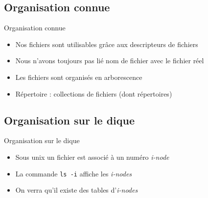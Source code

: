 \subsection{\sectitle}
\begin{frame}[containsverbatim]{\sectitle}
\def\subsectitle{Organisation connue}
\subsection{\subsectitle}
\begin{block}{\subsectitle}
\begin{itemize}
    \item Nos fichiers sont utilisables grâce aux descripteurs de fichiers
    \item Nous n'avons toujours pas lié nom de fichier avec le fichier réel
    \item Les fichiers sont organisés en arborescence
    \item Répertoire : collections de fichiers (dont répertoires)
\end{itemize}
\end{block}

\def\subsectitle{Organisation sur le dique}
\subsection{\subsectitle}
\begin{block}{\subsectitle}
    \begin{itemize}
        \item Sous unix un fichier est associé à un numéro \textit{i-node}
        \item La commande \verb+ls -i+ affiche les \textit{i-nodes}
        \item On verra qu'il existe des tables d'\textit{i-nodes}
    \end{itemize}
\end{block}

\end{frame}


\def\sectitle{Modifications de l'arborescence}
